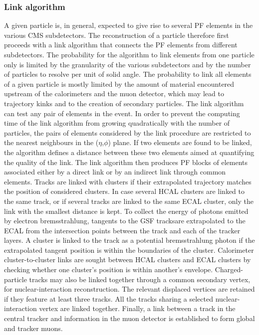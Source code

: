\subsubsection{Link algorithm}
A given particle is, in general, expected to give rise to several PF elements in the various CMS subdetectors. The reconstruction of a particle therefore first proceeds with a link algorithm that connects the PF elements from different subdetectors. The probability for the algorithm to link elements from one particle only is limited by the granularity of the various subdetectors and by the number of particles to resolve per unit of solid angle. The probability to link all elements of a given particle is mostly limited by the amount of material encountered upstream of the calorimeters and the muon detector, which may lead to trajectory kinks and to the creation of secondary particles. The link algorithm can test any pair of elements in the event. In order to prevent the computing time of the link algorithm from growing quadratically with the number of particles, the pairs of elements considered by the link procedure are restricted to the nearest neighbours in the ($\eta$,$\phi$) plane. If two elements are found to be linked, the algorithm defines a distance between these two elements aimed at quantifying the quality of the link. The link algorithm then produces PF blocks of elements associated either by a direct link or by an indirect link through common elements. Tracks are linked with clusters if their extrapolated trajectory matches the position of considered clusters. In case several HCAL clusters are linked to the same track, or if several tracks are linked to the same ECAL cluster, only the link with the smallest distance is kept. To collect the energy of photons emitted by electron bremsstrahlung, tangents to the GSF tracksare extrapolated to the ECAL from the intersection points between the track and each of the tracker  layers. A cluster is linked to the track as a potential bremsstrahlung photon if the extrapolated tangent position is within the boundaries of the cluster. Calorimeter cluster-to-cluster links are sought between HCAL clusters and ECAL clusters by checking whether one cluster's position is within another's envelope. Charged-particle tracks may also be linked together through a common secondary vertex, for nuclear-interaction reconstruction. The relevant displaced vertices are retained if they feature at least three tracks. All the tracks sharing a selected nuclear-interaction vertex are linked together. Finally, a link between a track in the central tracker and information in the muon detector is established to form global and tracker muons.

